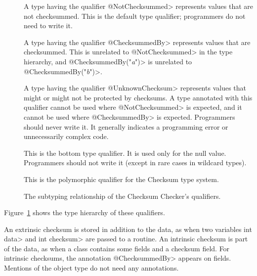 \begin{description}

    \item[]
    A type having the qualifier \<@NotChecksummed> represents values that are not checksummed.
    This is the default type qualifier;  programmers do not need to write it.

    \item[]
    A type having the qualifier \<@ChecksummedBy> represents values that are checksummed.
    This is unrelated to \<@NotChecksummed> in the type hierarchy,
    and \<@ChecksummedBy{\small("\emph{a}")}> is unrelated to
    \<@ChecksummedBy{\small("\emph{b}")}>.

    \item[]
    A type having the qualifier \<@UnknownChecksum> represents values
    that might or might not be protected by checksums.
    A type annotated with this qualifier cannot be used where
    \<@NotChecksummed> is expected, and it cannot be used where
    \<@ChecksummedBy> is expected. Programmers should never write it.
    It generally indicates a programming error or unnecessarily complex code.

    \item[]
    This is the bottom type qualifier. It is used only for the null value.
    Programmers should not write it (except in rare cases in wildcard types).

    \item[]
    This is the polymorphic qualifier for the Checksum type system.

\end{description}

\begin{figure}
    \caption{The subtyping relationship of the Checksum Checker's qualifiers.}
    \label{fig-checksum-hierarchy}
\end{figure}

Figure~\ref{fig-checksum-hierarchy} shows the type hierarchy of these
qualifiers.

An extrinsic checksum is stored in addition to the data, as when two variables
\<int data> and \<int checksum> are passed to a routine.  An intrinsic checksum is part of the data,
as when a class contains some fields and a checksum field.  For intrinsic checksums, the annotation
\<@ChecksummedBy> appears on fields.  Mentions of the object type do not need any annotations.

